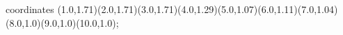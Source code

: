 					coordinates { (1.0,1.71)(2.0,1.71)(3.0,1.71)(4.0,1.29)(5.0,1.07)(6.0,1.11)(7.0,1.04)(8.0,1.0)(9.0,1.0)(10.0,1.0)};